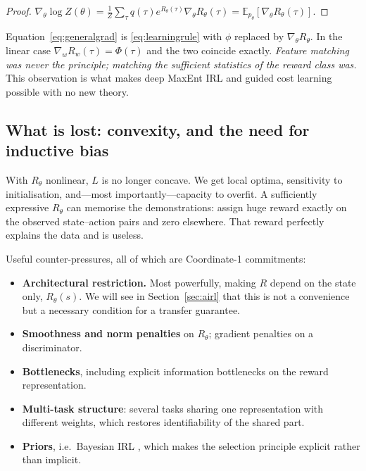 \documentclass[11pt]{article}
\theoremstyle{plain}
\theoremstyle{definition}
\theoremstyle{remark}
\newcommand{\E}{\mathbb{E}}
\begin{document}
\begin{proof}
$\nabla_\theta\log Z(\theta) = \frac1Z\sum_\tau q(\tau)e^{R_\theta(\tau)}
\nabla_\theta R_\theta(\tau) = \E_{p_\theta}[\nabla_\theta R_\theta(\tau)]$.
\end{proof}

Equation~\eqref{eq:generalgrad} is \eqref{eq:learningrule} with $\phi$
replaced by $\nabla_\theta R_\theta$. In the linear case $\nabla_w
R_w(\tau) = \Phi(\tau)$ and the two coincide exactly. \emph{Feature
matching was never the principle; matching the sufficient statistics of
the reward class was.} This observation is what makes deep MaxEnt IRL
\cite{wulfmeier2015} and guided cost learning \cite{finn2016} possible
with no new theory.

\subsection{What is lost: convexity, and the need for inductive bias}

With $R_\theta$ nonlinear, $L$ is no longer concave. We get local optima,
sensitivity to initialisation, and---most importantly---capacity to
overfit. A sufficiently expressive $R_\theta$ can memorise the
demonstrations: assign huge reward exactly on the observed state--action
pairs and zero elsewhere. That reward perfectly explains the data and is
useless.

Useful counter-pressures, all of which are Coordinate-1 commitments:

\begin{itemize}
\item \textbf{Architectural restriction.} Most powerfully, making $R$
depend on the state only, $R_\theta(s)$. We will see in
Section~\ref{sec:airl} that this is not a convenience but a necessary
condition for a transfer guarantee.
\item \textbf{Smoothness and norm penalties} on $R_\theta$; gradient
penalties on a discriminator.
\item \textbf{Bottlenecks}, including explicit information bottlenecks on
the reward representation.
\item \textbf{Multi-task structure}: several tasks sharing one
representation with different weights, which restores identifiability of
the shared part.
\item \textbf{Priors}, i.e.\ Bayesian IRL \cite{ramachandran2007}, which
makes the selection principle explicit rather than implicit.
\end{itemize}
\end{document}

